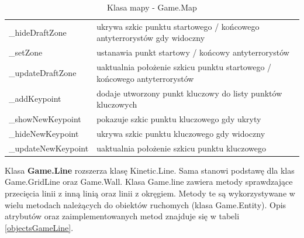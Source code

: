 \begin{table}
\begin{center}
\begin{tabular}{|p{}|p{}|}
	\_hideDraftZone & ukrywa szkic punktu startowego / końcowego antyterrorystów gdy widoczny\\
	\_setZone & ustanawia punkt startowy / końcowy antyterrorystów\\ 
	\_updateDraftZone & uaktualnia położenie szkicu punktu startowego / końcowego antyterrorystów \\
	\_addKeypoint & dodaje utworzony punkt kluczowy do listy punktów kluczowych\\
	\_showNewKeypoint & pokazuje szkic punktu kluczowego gdy ukryty\\ 
	\_hideNewKeypoint & ukrywa szkic punktu kluczowego gdy widoczny\\
	\_updateNewKeypoint & uaktualnia położenie szkicu punktu kluczowego 
\\\hline
\end{tabular}
\caption {Klasa mapy - Game.Map\label{objectsGameMap}}
\end{center}
\end{table} 


Klasa \textbf{Game.Line} rozszerza klasę Kinetic.Line. Sama stanowi podstawę dla klas Game.GridLine oraz Game.Wall. Klasa Game.line zawiera metody sprawdzające przecięcia linii z inną linią oraz linii z okręgiem. Metody te są wykorzystywane w wielu metodach należących do obiektów ruchomych (klasa Game.Entity). Opis atrybutów oraz zaimplementowanych metod znajduje się w tabeli \ref{objectsGameLine}.   

